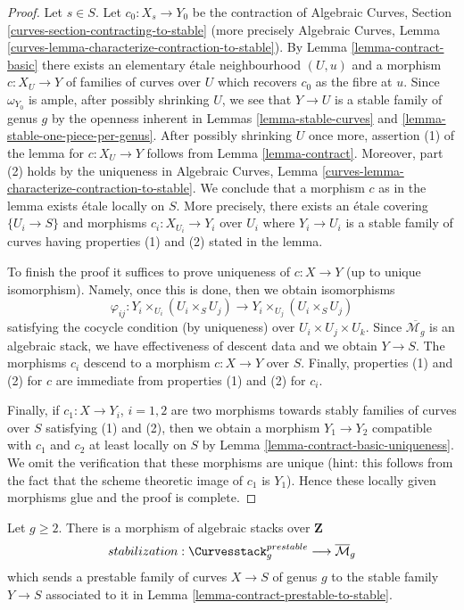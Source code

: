 \begin{proof}
Let $s \in S$. Let $c_0 : X_s \to Y_0$ be the contraction of
Algebraic Curves, Section \ref{curves-section-contracting-to-stable}
(more precisely Algebraic Curves, Lemma
\ref{curves-lemma-characterize-contraction-to-stable}).
By Lemma \ref{lemma-contract-basic}
there exists an elementary \'etale neighbourhood
$(U, u)$ and a morphism $c : X_U \to Y$
of families of curves over $U$ which recovers
$c_0$ as the fibre at $u$.
Since $\omega_{Y_0}$ is ample, after possibly shrinking $U$,
we see that $Y \to U$ is a stable family of genus $g$
by the openness inherent in
Lemmas \ref{lemma-stable-curves} and \ref{lemma-stable-one-piece-per-genus}.
After possibly shrinking $U$ once more, assertion (1) of the lemma for
$c : X_U \to Y$ follows from Lemma \ref{lemma-contract}.
Moreover, part (2) holds by the uniqueness in Algebraic Curves, Lemma
\ref{curves-lemma-characterize-contraction-to-stable}.
We conclude that a morphism $c$ as in the lemma exists \'etale locally
on $S$. More precisely, there exists an \'etale covering
$\{U_i \to S\}$ and morphisms $c_i : X_{U_i} \to Y_i$ over $U_i$
where $Y_i \to U_i$ is a stable family of curves
having properties (1) and (2) stated in the lemma.

\medskip\noindent
To finish the proof it suffices to prove uniqueness of $c : X \to Y$
(up to unique isomorphism). Namely, once this is done, then we
obtain isomorphisms
$$
\varphi_{ij} :
Y_i \times_{U_i} (U_i \times_S U_j)
\longrightarrow
Y_i \times_{U_j} (U_i \times_S U_j)
$$
satisfying the cocycle condition (by uniqueness) over
$U_i \times U_j \times U_k$. Since $\overline{\mathcal{M}_g}$
is an algebraic stack, we have effectiveness of descent data
and we obtain $Y \to S$. The morphisms $c_i$ descend to a morphism
$c : X \to Y$ over $S$. Finally, properties (1) and (2) for $c$
are immediate from properties (1) and (2) for $c_i$.

\medskip\noindent
Finally, if $c_1 : X \to Y_i$, $i = 1, 2$ are two morphisms towards
stably families of curves over $S$ satisfying (1) and (2), then
we obtain a morphism $Y_1 \to Y_2$ compatible with $c_1$ and $c_2$
at least locally on $S$ by Lemma \ref{lemma-contract-basic-uniqueness}.
We omit the verification that these morphisms are unique
(hint: this follows from the fact that the scheme theoretic image
of $c_1$ is $Y_1$). Hence these locally given morphisms glue
and the proof is complete.
\end{proof}

\begin{lemma}
\label{lemma-stabilization-morphism}
Let $g \geq 2$. There is a morphism of algebraic stacks over $\mathbf{Z}$
$$
stabilization :
\Curvesstack^{prestable}_g
\longrightarrow
\overline{\mathcal{M}}_g
$$
which sends a prestable family of curves $X \to S$ of genus $g$
to the stable family $Y \to S$ associated to it in
Lemma \ref{lemma-contract-prestable-to-stable}.
\end{lemma}

